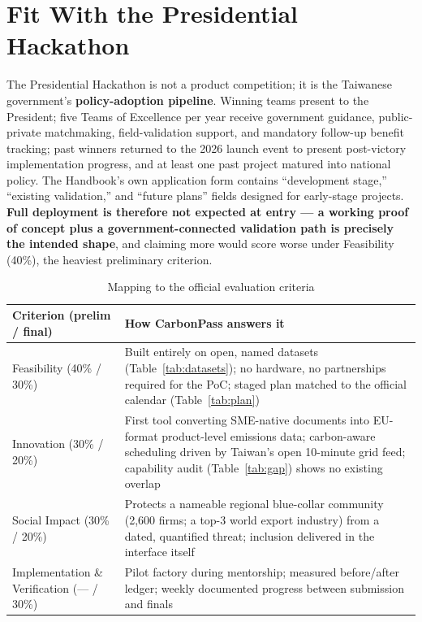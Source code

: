 \section{Fit With the Presidential Hackathon}\label{sec:fit}

The Presidential Hackathon is not a product competition; it is the Taiwanese
government's \textbf{policy-adoption pipeline}. Winning teams present to the
President; five Teams of Excellence per year receive government guidance,
public-private matchmaking, field-validation support, and mandatory follow-up
benefit tracking; past winners returned to the 2026 launch event to present
post-victory implementation progress, and at least one past project matured
into national policy\cite{pmc,moda}. The Handbook's own application form
contains ``development stage,'' ``existing validation,'' and ``future plans''
fields designed for early-stage projects\cite{handbook}. \textbf{Full
deployment is therefore not expected at entry --- a working proof of concept
plus a government-connected validation path is precisely the intended shape},
and claiming more would score worse under Feasibility (40\%), the heaviest
preliminary criterion.

\begin{table}[htbp]
\caption{Mapping to the official evaluation criteria\cite{handbook}}
\label{tab:criteria}
\small
\begin{tabularx}{\textwidth}{@{}p{}X@{}}
\toprule
\textbf{Criterion (prelim / final)} & \textbf{How CarbonPass answers it} \\
\midrule
Feasibility (40\% / 30\%) & Built entirely on open, named datasets (Table~\ref{tab:datasets}); no hardware, no partnerships required for the PoC; staged plan matched to the official calendar (Table~\ref{tab:plan}) \\
Innovation (30\% / 20\%) & First tool converting SME-native documents into EU-format product-level emissions data; carbon-aware scheduling driven by Taiwan's open 10-minute grid feed; capability audit (Table~\ref{tab:gap}) shows no existing overlap \\
Social Impact (30\% / 20\%) & Protects a nameable regional blue-collar community (2,600 firms; a top-3 world export industry) from a dated, quantified threat; inclusion delivered in the interface itself \\
Implementation \& Verification (--- / 30\%) & Pilot factory during mentorship; measured before/after ledger; weekly documented progress between submission and finals \\
\bottomrule
\end{tabularx}
\end{table}

